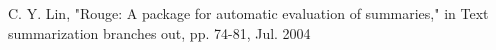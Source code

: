 \documentclass[conference]{IEEEtran}
\begin{document}
\begin{thebibliography}{00}
 C. Y. Lin, "Rouge: A package for automatic evaluation of summaries," in Text summarization branches out, pp. 74-81, Jul. 2004







\end{thebibliography}
\end{document}
